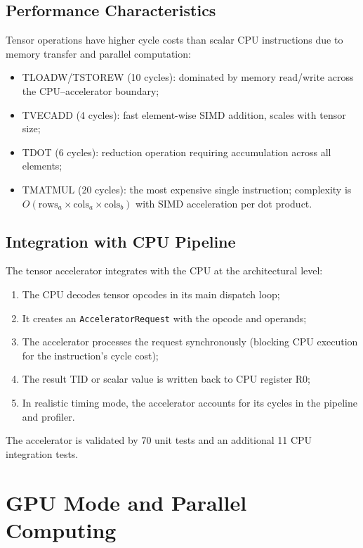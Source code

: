 \documentclass[10pt,a4paper,twoside]{book}
\begin{document}
\section{Performance Characteristics}

Tensor operations have higher cycle costs than scalar CPU instructions due to
memory transfer and parallel computation:
\begin{itemize}
    \item TLOADW/TSTOREW (10 cycles): dominated by memory read/write across the
          CPU--accelerator boundary;
    \item TVECADD (4 cycles): fast element-wise SIMD addition, scales with tensor
          size;
    \item TDOT (6 cycles): reduction operation requiring accumulation across all
          elements;
    \item TMATMUL (20 cycles): the most expensive single instruction; complexity is
          $O(\text{rows}_a \times \text{cols}_a \times \text{cols}_b)$ with SIMD
          acceleration per dot product.
\end{itemize}

\section{Integration with CPU Pipeline}

The tensor accelerator integrates with the CPU at the architectural level:
\begin{enumerate}
    \item The CPU decodes tensor opcodes in its main dispatch loop;
    \item It creates an \texttt{AcceleratorRequest} with the opcode and operands;
    \item The accelerator processes the request synchronously (blocking CPU
          execution for the instruction's cycle cost);
    \item The result TID or scalar value is written back to CPU register R0;
    \item In realistic timing mode, the accelerator accounts for its cycles in
          the pipeline and profiler.
\end{enumerate}

The accelerator is validated by 70 unit tests and an additional 11 CPU integration
tests.

\chapter{GPU Mode and Parallel Computing}
\label{ch:gpu}
\end{document}
